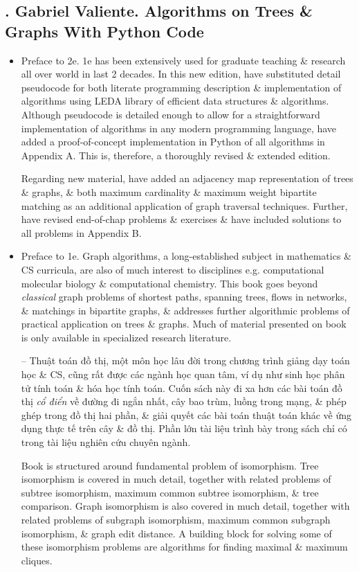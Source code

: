\documentclass{article}
\begin{document}
\subsection{\cite{Valiente2002, Valiente2021}. {\sc Gabriel Valiente}. Algorithms on Trees \& Graphs With Python Code}

\begin{itemize}
	\item {\sf Preface to 2e.} 1e has been extensively used for graduate teaching \& research all over world in last 2 decades. In this new edition, have substituted detail pseudocode for both literate programming description \& implementation of algorithms using LEDA library of efficient data structures \& algorithms. Although pseudocode is detailed enough to allow for a straightforward implementation of algorithms in any modern programming language, have added a proof-of-concept implementation in Python of all algorithms in Appendix A. This is, therefore, a thoroughly revised \& extended edition.
	
	Regarding new material, have added an adjacency map representation of trees \& graphs, \& both maximum cardinality \& maximum weight bipartite matching as an additional application of graph traversal techniques. Further, have revised end-of-chap problems \& exercises \& have included solutions to all problems in Appendix B.
	\item {\sf Preface to 1e.} Graph algorithms, a long-established subject in mathematics \& CS curricula, are also of much interest to disciplines e.g. computational molecular biology \& computational chemistry. This book goes beyond {\it classical} graph problems of shortest paths, spanning trees, flows in networks, \& matchings in bipartite graphs, \& addresses further algorithmic problems of practical application on trees \& graphs. Much of material presented on book is only available in specialized research literature.
	
	-- Thuật toán đồ thị, một môn học lâu đời trong chương trình giảng dạy toán học \& CS, cũng rất được các ngành học quan tâm, ví dụ như sinh học phân tử tính toán \& hóa học tính toán. Cuốn sách này đi xa hơn các bài toán đồ thị {\it cổ điển} về đường đi ngắn nhất, cây bao trùm, luồng trong mạng, \& phép ghép trong đồ thị hai phần, \& giải quyết các bài toán thuật toán khác về ứng dụng thực tế trên cây \& đồ thị. Phần lớn tài liệu trình bày trong sách chỉ có trong tài liệu nghiên cứu chuyên ngành.
	
	Book is structured around fundamental problem of isomorphism. Tree isomorphism is covered in much detail, together with related problems of subtree isomorphism, maximum common subtree isomorphism, \& tree comparison. Graph isomorphism is also covered in much detail, together with related problems of subgraph isomorphism, maximum common subgraph isomorphism, \& graph edit distance. A building block for solving some of these isomorphism problems are algorithms for finding maximal \& maximum cliques.
	

\end{itemize}
\end{document}
